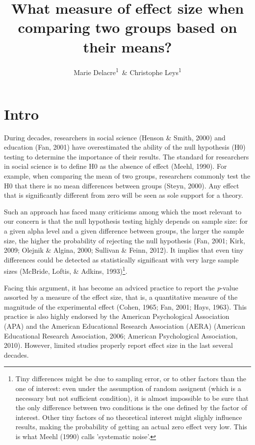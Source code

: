 \documentclass[
  man]{apa6}
\affiliation{
\vspace{0.5cm}
\textsuperscript{1} Université Libre de Bruxelles, Service of Analysis of the Data (SAD), Bruxelles, Belgium}
\title{What measure of effect size when comparing two groups based on their means?}
\author{Marie Delacre\textsuperscript{1}~\& Christophe Leys\textsuperscript{1}}
\date{}
\begin{document}
\maketitle

\hypertarget{intro}{%
\section{Intro}\label{intro}}

During decades, researchers in social science (Henson \& Smith, 2000) and education (Fan, 2001) have overestimated the ability of the null hypothesis (H0) testing to determine the importance of their results. The standard for researchers in social science is to define H0 as the absence of effect (Meehl, 1990). For example, when comparing the mean of two groups, researchers commonly test the H0 that there is no mean differences between groups (Steyn, 2000). Any effect that is significantly different from zero will be seen as sole support for a theory.

Such an approach has faced many criticisms among which the most relevant to our concern is that the null hypothesis testing highly depends on sample size: for a given alpha level and a given difference between groups, the larger the sample size, the higher the probability of rejecting the null hypothesis (Fan, 2001; Kirk, 2009; Olejnik \& Algina, 2000; Sullivan \& Feinn, 2012). It implies that even tiny differences could be detected as statistically significant with very large sample sizes (McBride, Loftis, \& Adkins, 1993)\footnote{Tiny differences might be due to sampling error, or to other factors than the one of interest: even under the assumption of random assignent (which is a necessary but not sufficient condition), it is almost impossible to be sure that the only difference between two conditions is the one defined by the factor of interest. Other tiny factors of no theoretical interest might slighly influence results, making the probability of getting an actual zero effect very low. This is what Meehl (1990) calls 'systematic noise'.}.

Facing this argument, it has become an adviced practice to report the \emph{p}-value assorted by a measure of the effect size, that is, a quantitative measure of the magnitude of the experimental effect (Cohen, 1965; Fan, 2001; Hays, 1963). This practice is also highly endorsed by the American Psychological Association (APA) and the American Educational Research Association (AERA) (American Educational Research Association, 2006; American Psychological Association, 2010). However, limited studies properly report effect size in the last several decades.
\end{document}
